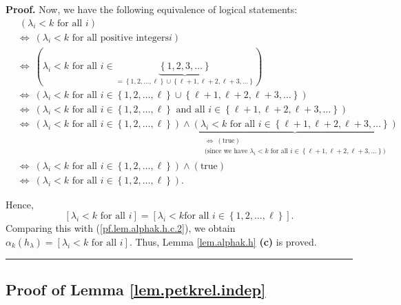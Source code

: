 \documentclass[numbers=enddot,12pt,final,onecolumn,notitlepage]{scrartcl}%
\theoremstyle{definition}
\newenvironment{proof}[1][Proof]{\noindent\textbf{#1.} }{\ \rule{0.5em}{0.5em}}
\newenvironment{verlong}{}{}
\begin{document}
\begin{proof}
\begin{verlong}
Now, we have the following equivalence of logical statements:%
\begin{align*}
&  \ \left(  \lambda_{i}<k\text{ for all }i\right) \\
&  \Longleftrightarrow\ \left(  \lambda_{i}<k\text{ for all positive integers
}i\right) \\
&  \Longleftrightarrow\ \left(  \lambda_{i}<k\text{ for all }i\in
\underbrace{\left\{  1,2,3,\ldots\right\}  }_{=\left\{  1,2,\ldots
,\ell\right\}  \cup\left\{  \ell+1,\ell+2,\ell+3,\ldots\right\}  }\right) \\
&  \Longleftrightarrow\ \left(  \lambda_{i}<k\text{ for all }i\in\left\{
1,2,\ldots,\ell\right\}  \cup\left\{  \ell+1,\ell+2,\ell+3,\ldots\right\}
\right) \\
&  \Longleftrightarrow\ \left(  \lambda_{i}<k\text{ for all }i\in\left\{
1,2,\ldots,\ell\right\}  \text{ and all }i\in\left\{  \ell+1,\ell
+2,\ell+3,\ldots\right\}  \right) \\
&  \Longleftrightarrow\ \left(  \lambda_{i}<k\text{ for all }i\in\left\{
1,2,\ldots,\ell\right\}  \right)  \wedge\underbrace{\left(  \lambda
_{i}<k\text{ for all }i\in\left\{  \ell+1,\ell+2,\ell+3,\ldots\right\}
\right)  }_{\substack{\Longleftrightarrow\ \left(  \text{true}\right)
\\\text{(since we have }\lambda_{i}<k\text{ for all }i\in\left\{  \ell
+1,\ell+2,\ell+3,\ldots\right\}  \text{)}}}\\
&  \Longleftrightarrow\ \left(  \lambda_{i}<k\text{ for all }i\in\left\{
1,2,\ldots,\ell\right\}  \right)  \wedge\left(  \text{true}\right) \\
&  \Longleftrightarrow\ \left(  \lambda_{i}<k\text{ for all }i\in\left\{
1,2,\ldots,\ell\right\}  \right)  .
\end{align*}

\end{verlong}

Hence,%
\[
\left[  \lambda_{i}<k\text{ for all }i\right]  =\left[  \lambda_{i}<k\text{
for all }i\in\left\{  1,2,\ldots,\ell\right\}  \right]  .
\]
Comparing this with (\ref{pf.lem.alphak.h.c.2}), we obtain $\alpha_{k}\left(
h_{\lambda}\right)  =\left[  \lambda_{i}<k\text{ for all }i\right]  $. Thus,
Lemma \ref{lem.alphak.h} \textbf{(c)} is proved.
\end{proof}

\subsection{\label{subsect.proofs.petkrel.indep}Proof of Lemma
\ref{lem.petkrel.indep}}
\end{document}
